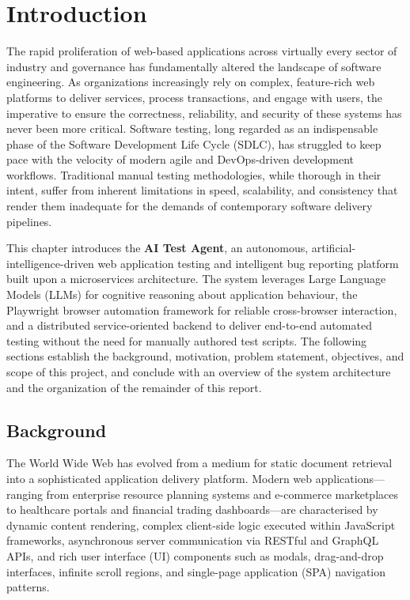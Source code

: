 
\chapter{Introduction}
\label{chap:intro}

The rapid proliferation of web-based applications across virtually every sector of industry and governance has fundamentally altered the landscape of software engineering. As organizations increasingly rely on complex, feature-rich web platforms to deliver services, process transactions, and engage with users, the imperative to ensure the correctness, reliability, and security of these systems has never been more critical. Software testing, long regarded as an indispensable phase of the Software Development Life Cycle (SDLC), has struggled to keep pace with the velocity of modern agile and DevOps-driven development workflows. Traditional manual testing methodologies, while thorough in their intent, suffer from inherent limitations in speed, scalability, and consistency that render them inadequate for the demands of contemporary software delivery pipelines.

This chapter introduces the \textbf{AI Test Agent}, an autonomous, artificial-intelligence-driven web application testing and intelligent bug reporting platform built upon a microservices architecture. The system leverages Large Language Models (LLMs) for cognitive reasoning about application behaviour, the Playwright browser automation framework for reliable cross-browser interaction, and a distributed service-oriented backend to deliver end-to-end automated testing without the need for manually authored test scripts. The following sections establish the background, motivation, problem statement, objectives, and scope of this project, and conclude with an overview of the system architecture and the organization of the remainder of this report.


\section{Background}
\label{sec:background}

The World Wide Web has evolved from a medium for static document retrieval into a sophisticated application delivery platform. Modern web applications---ranging from enterprise resource planning systems and e-commerce marketplaces to healthcare portals and financial trading dashboards---are characterised by dynamic content rendering, complex client-side logic executed within JavaScript frameworks, asynchronous server communication via RESTful and GraphQL APIs, and rich user interface (UI) components such as modals, drag-and-drop interfaces, infinite scroll regions, and single-page application (SPA) navigation patterns.

